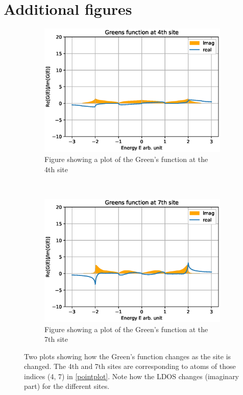 \appendix
\appendixpage
\addappheadtotoc
\section{Additional figures}\label{appfigs}
\begin{figure}[h]
	\centering
	\begin{subfigure}[b]{0.3\textwidth}
		\includegraphics[width=\textwidth]{Figures/BetaimrealTE4.eps}
		\caption{Figure showing a plot of the Green's function at the 4th site}
		\label{4th}
	\end{subfigure}
	~ %
	\begin{subfigure}[b]{0.3\textwidth}
		\includegraphics[width=\textwidth]{Figures/BetaimrealTE7.eps}
		\caption{Figure showing a plot of the Green's function at the 7th site}
		\label{7th}
	\end{subfigure}
	\caption{Two plots showing how the Green's function changes as the site is changed. The 4th and 7th sites are corresponding to atoms of those indices (4, 7) in \cref{pointplot}. Note how the LDOS changes (imaginary part) for the different sites.}\label{siteLDOSplot}
\end{figure}
